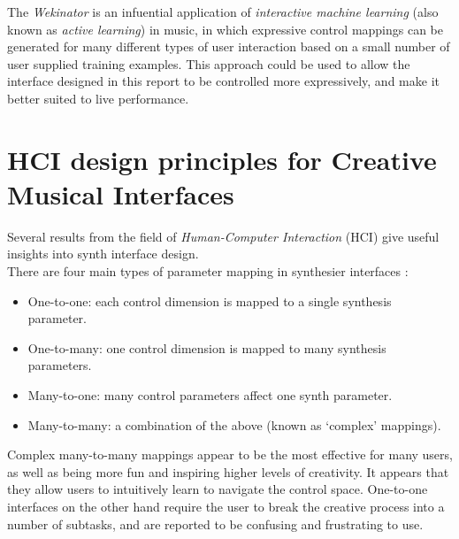 \documentclass[11pt, oneside]{report}   	%
\begin{document}
The \emph{Wekinator} \cite{Wekinator} is an infuential application of \emph{interactive machine learning} (also known as \emph{active learning}) in music, in which expressive control mappings can be generated for many different types of user interaction based on a small number of user supplied training examples. This approach could be used to allow the interface designed in this report to be controlled more expressively, and make it better suited to live performance.
\section{HCI design principles for Creative Musical Interfaces}\label{sec:Tubb}
Several results from the field of \emph{Human-Computer Interaction} (HCI) give useful insights into synth interface design.\\
There are four main types of parameter mapping in synthesier interfaces \cite{MappingStrategies}:
\begin{itemize}
\vspace{-10pt}
\setlength\itemsep{-1.2em}
\item One-to-one: each control dimension is mapped to a single synthesis parameter.
\item One-to-many: one control dimension is mapped to many synthesis parameters.
\item Many-to-one: many control parameters affect one synth parameter.
\item Many-to-many: a combination of the above (known as ‘complex’ mappings).
\end{itemize}
\vspace{-10pt}
Complex many-to-many mappings appear to be the most effective for many users, as well as being more fun and inspiring higher levels of creativity. It appears that they allow users to intuitively learn to navigate the control space. One-to-one interfaces on the other hand require the user to break the creative process into a number of subtasks, and are reported to be confusing and frustrating to use.
\end{document}
